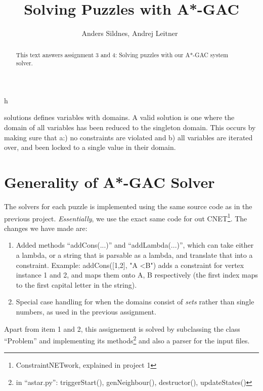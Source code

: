\documentclass[journal]{IEEEtran}
\begin{document}
%
\title{Solving Puzzles with A*-GAC}

\author{Anders Sildnes, Andrej Leitner~%
}%

%
{h}

\maketitle

\begin{abstract}
    This text answers assignment 3 and 4: Solving puzzles with our A*-GAC system solver.
\end{abstract}

 solutions defines variables with domains.
A valid solution is one where the domain of all variables has been reduced to the
singleton domain. This occurs by making sure that a:) no constraints are violated
and b) all variables are iterated over, and been locked to a single value in their
domain.

\section*{Generality of A*-GAC Solver}
The solvers for each puzzle is implemented using the same source code as in
the previous project. \textit{Essentially}, we use the exact same code for out 
CNET\footnote{ConstraintNETwork, explained in project 1}. The changes we have made
are:
\begin{enumerate}
    \item Added methods ``addCons(...)'' and ``addLambda(...)'', which can take
        either a lambda, or a string that is parsable as a lambda, and translate
        that into a constraint. 
        Example: addCons([1,2], "A \textless B") adds a constraint for vertex instance
        1 and 2, and maps them onto A, B respectively (the first index maps
        to the first capital letter in the string).
    \item Special case handling for when the domains consist of \textit{sets} rather
        than single numbers, as used in the previous assignment.
\end{enumerate}
Apart from item 1 and 2, this assignement is solved by subclassing the class
``Problem'' and implementing its methods\footnote{in ``astar.py'': triggerStart(), genNeighbour(), destructor(), updateStates()}
and also a parser for the input files.
\end{document}
